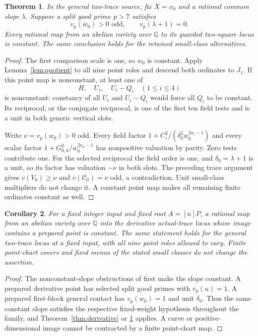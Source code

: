 \documentclass[11pt,a4paper]{article}
\newtheorem{theorem}{Theorem}[section]
\newtheorem{corollary}[theorem]{Corollary}
\newcommand{\Q}{\mathbb Q}
\begin{document}
\begin{theorem}\label{thm:general}
In the general two-trace source, fix $X=x_0$ and a rational
common slope $\lambda$. Suppose a split good prime $p>7$ satisfies
\[
                v_p(w_0)>0\text{ odd},\qquad
                v_p(\lambda+1)=0.
\]
Every rational map from an abelian variety over $\Q$ to its
guarded two-square locus is constant. The same conclusion holds
for the retained small-class alternatives.
\end{theorem}
\begin{proof}
The first comparison scale is one, so $w_0$ is constant.
Apply Lemma~\ref{lem:quotient} to all nine point roles and
descend both ordinates to $J_1$. If this point map is nonconstant,
at least one of
\[
                   H,\quad U_i,\quad U_i-Q_i\quad(1\le i\le4)
\]
is nonconstant: constancy of all $U_i$ and $U_i-Q_i$ would
force all $Q_i$ to be constant. Its reciprocal, or the conjugate
reciprocal, is one of the first ten field tests and is a unit in
both generic vertical slots.

Write $\nu=v_p(w_0)>0$ odd. Every field factor
$1+C_i^2/(\delta_0^2w_0^{2a_i-1})$ and every scalar factor
$1+G_{0,k}^2/w_0^{2\kappa_k-1}$ has nonpositive valuation by
parity. Zero tests contribute one. For the selected reciprocal
the field order is one, and $\delta_0=\lambda+1$ is a unit,
so its factor has valuation $-\nu$ in both slots. The preceding
trace argument gives $v(V_0)\ge\nu$ and
$v(\mathcal C_0)=\nu$ odd, a contradiction. Unit small-class
multipliers do not change it. A constant point map makes all
remaining finite ordinates constant as well.
\end{proof}

\begin{corollary}\label{cor:prepared}
For a fixed integer input and fixed root $A=[n]P$, a rational
map from an abelian variety over $\Q$ into the derivative
actual-trace locus whose image contains a prepared point is
constant. The same statement holds for the general two-trace
locus at a fixed input, with all nine point roles allowed to vary.
Finite point-chart covers and fixed menus of the stated small
classes do not change the assertion.
\end{corollary}
\begin{proof}
The nonconstant-slope obstructions of \cite{Families} first
make the slope constant. A prepared derivative point has selected
split good primes with $v_p(u)=1$. A prepared first-block general
contact has $v_p(w_0)=1$ and unit $\delta_0$. Thus the same
constant slope satisfies the respective fixed-weight hypothesis
throughout the family, and Theorem~\ref{thm:derivative} or
\ref{thm:general} applies. A curve or positive-dimensional
image cannot be contracted by a finite point-chart map.
\end{proof}
\end{document}
